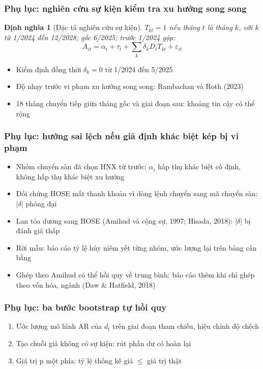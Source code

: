 \documentclass[11pt, xcolor={dvipsnames}, aspectratio=169, usepdftitle=false]{beamer}
\newtheorem{dinhnghia}{Định nghĩa} %
\begin{document}
\begin{frame}[label=suKien]
\frametitle{Phụ lục: nghiên cứu sự kiện kiểm tra xu hướng song song}
\begin{dinhnghia}[Đặc tả nghiên cứu sự kiện]
$T_{kt} = 1$ nếu tháng $t$ là tháng $k$, với $k$ từ 1/2024 đến 12/2028; gốc 6/2025; trước 1/2024 gộp:
\[
A_{it} = \alpha_i + \tau_t + \sum_k \delta_k D_i T_{kt} + \varepsilon_{it}
\]
\end{dinhnghia}
\begin{itemize}
\item Kiểm định đồng thời $\delta_k = 0$ từ 1/2024 đến 5/2025
\item Độ nhạy trước vi phạm xu hướng song song: Rambachan và Roth (2023)
\item 18 tháng chuyển tiếp giữa tháng gốc và giai đoạn sau: khoảng tin cậy có thể rộng
\end{itemize}
\end{frame}

\begin{frame}[label=saiLech]
\frametitle{Phụ lục: hướng sai lệch nếu giả định khác biệt kép bị vi phạm}
\begin{itemize}
\item Nhóm chuyển sàn đã chọn HNX từ trước: $\alpha_i$ hấp thụ khác biệt cố định, không hấp thụ khác biệt xu hướng
\item Đối chứng HOSE mất thanh khoản vì dòng lệnh chuyển sang mã chuyển sàn: $|\delta|$ phóng đại
\item Lan tỏa dương sang HOSE (Amihud và cộng sự, 1997; Hisada, 2018): $|\delta|$ bị đánh giá thấp
\item Rời mẫu: báo cáo tỷ lệ hủy niêm yết từng nhóm, ước lượng lại trên bảng cân bằng
\item Ghép theo Amihud có thể hồi quy về trung bình: báo cáo thêm khi chỉ ghép theo vốn hóa, ngành (Daw \& Hatfield, 2018)
\end{itemize}
\end{frame}

\begin{frame}[label=baBuoc]
\frametitle{Phụ lục: ba bước bootstrap tự hồi quy}
\begin{enumerate}
\item Ước lượng mô hình AR của $d_t$ trên giai đoạn tham chiếu, hiệu chỉnh độ chệch
\item Tạo chuỗi giả không có sự kiện: rút phần dư có hoàn lại
\item Giá trị p một phía: tỷ lệ thống kê giả $\leq$ giá trị thật
\end{enumerate}
\end{frame}
\end{document}
